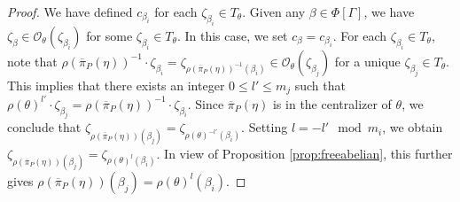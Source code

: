 \documentclass[12pt]{amsart}
\numberwithin{equation}{section}
\begin{document}
\begin{proof}
We have defined $c_{\beta_i}$ for each $\zeta_{\beta_i} \in T_{\theta}$. Given any $\beta \in \Phi[\Gamma]$, we have $\zeta_\beta\in  \mathcal{O}_{\theta}(\zeta_{\beta_i})$ for some $\zeta_{\beta_i} \in T_\theta$. In this case, we set $c_\beta=c_{\beta_{i}}$.  For each $\zeta_{\beta_i}\in T_\theta$, note that $\rho(\overline{\pi}_P(\eta))^{-1}\cdot\zeta_{\beta_i}=\zeta_{\rho(\overline{\pi}_P(\eta))^{-1}(\beta_i)} \in \mathcal{O}_{\theta}(\zeta_{\beta_j})$ for a unique $\zeta_{\beta_j} \in T_\theta$. This implies that there exists an integer $0\leq l'\leq m_j$ such that  $\rho(\theta)^{l'}\cdot \zeta_{\beta_j}=\rho(\overline{\pi}_P(\eta))^{-1}\cdot\zeta_{\beta_i}$. Since  $\overline{\pi}_P(\eta)$ is in the centralizer of $\theta$, we conclude that $\zeta_{\rho(\overline{\pi}_P(\eta))(\beta_j)}=\zeta_{\rho(\theta)^{-l'}(\beta_i)}$. Setting $l = -l' \mod m_i$, we obtain $\zeta_{\rho(\overline{\pi}_P(\eta))(\beta_j)}=\zeta_{\rho(\theta)^{l}(\beta_i)}$. In view of Proposition \ref{prop:freeabelian}, this further gives  $\rho(\overline{\pi}_P(\eta))(\beta_j)=\rho(\theta)^l(\beta_i)$.
\par


\end{proof}
\end{document}
